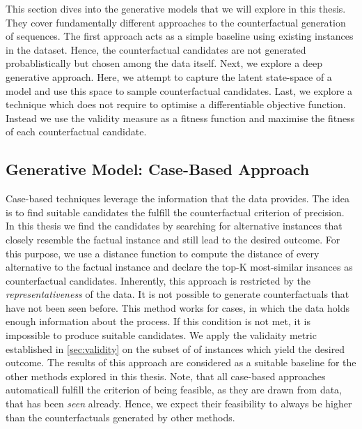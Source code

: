 \documentclass[./../../paper.tex]{subfiles}
\begin{document}
This section dives into the generative models that we will explore in this thesis. They cover fundamentally different approaches to the counterfactual generation of sequences. The first approach acts as a simple baseline using existing instances in the dataset. Hence, the counterfactual candidates are not generated probablistically but chosen among the data itself. Next, we explore a deep generative approach. Here, we attempt to capture the latent state-space of a model and use this space to sample counterfactual candidates.  Last, we explore a technique which does not require to optimise a differentiable objective function. Instead we use the validity measure as a fitness function and maximise the fitness of each counterfactual candidate.

\subsection{Generative Model: Case-Based Approach}
Case-based techniques leverage the information that the data provides. The idea is to find suitable candidates the fulfill the counterfactual criterion of precision. In this thesis we find the candidates by searching for alternative \glspl{instance} that closely resemble the factual instance and still lead to the desired outcome. For this purpose, we use a distance function to compute the distance of every alternative to the factual instance and declare the top-K most-similar insances as counterfactual candidates. Inherently, this approach is restricted by the \emph{representativeness} of the data. It is not possible to generate counterfactuals that have not been seen before. This method works for cases, in which the data holds enough information about the process. If this condition is not met, it is impossible to produce suitable candidates. 
We apply the validaity metric established in \autoref{sec:validity} on the subset of of instances which yield the desired outcome. 
The results of this approach are considered as a suitable baseline for the other methods explored in this thesis. Note, that all case-based approaches automaticall fulfill the criterion of being feasible, as they are drawn from data, that has been \emph{seen} already. Hence, we expect their feasibility to always be higher than the counterfactuals generated by other methods. 
\end{document}
